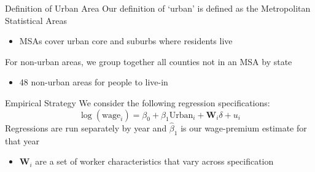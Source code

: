 \documentclass[aspectratio=169,t]{beamer}
\newcommand{\urban}{{\text{Urban}}}
\begin{document}
\begin{frame}{Definition of Urban Area}
  Our definition of `urban' is defined as the Metropolitan Statistical Areas
  \begin{itemize}
    \item MSAs cover urban core and suburbs where residents live
  \end{itemize}

  \bigskip
  For non-urban areas, we group together all counties not in an MSA by state
  \begin{itemize}
    \item 48 non-urban areas for people to live-in
  \end{itemize}
\end{frame}



% 
% 
% 
%     
% 

\begin{frame}{Empirical Strategy}
  We consider the following regression specifications:
  $$
    \log(\text{wage}_i) = \beta_0 + \beta_1 \urban_i + \bm{W}_i \delta + u_i
  $$
  Regressions are run separately by year and $\hat{\beta}_1$ is our wage-premium estimate for that year

  \begin{itemize}
    \item $\bm{W}_i$ are a set of worker characteristics that vary across specification
  \end{itemize}
\end{frame}
\end{document}
